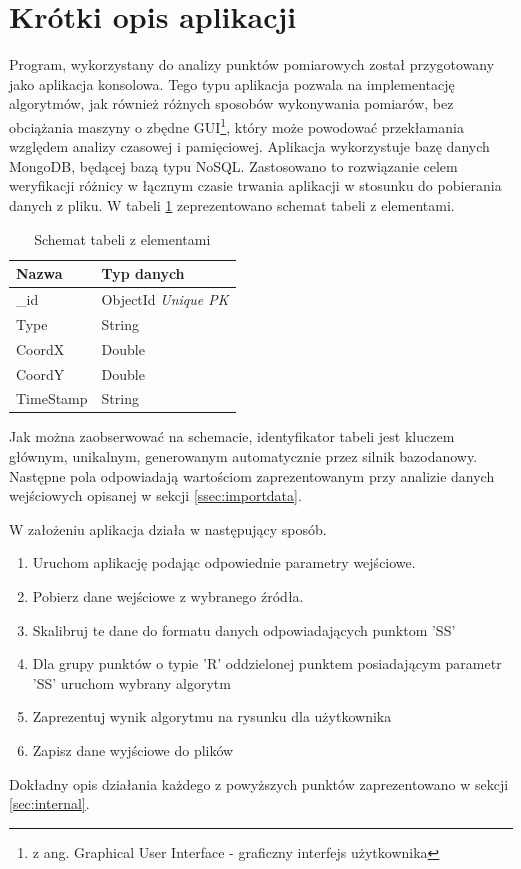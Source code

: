\section{Krótki opis aplikacji}
\label{sec:shortdesc}
Program, wykorzystany do analizy punktów pomiarowych został przygotowany jako aplikacja konsolowa. Tego typu aplikacja pozwala na implementację algorytmów, jak również różnych sposobów wykonywania pomiarów, bez obciążania maszyny o zbędne GUI\footnote{z ang. Graphical User Interface - graficzny interfejs użytkownika}, który może powodować przekłamania względem analizy czasowej i pamięciowej. Aplikacja wykorzystuje bazę danych MongoDB, będącej bazą typu NoSQL. Zastosowano to rozwiązanie celem weryfikacji różnicy w łącznym czasie trwania aplikacji w stosunku do pobierania danych z pliku. W tabeli \ref{tab:nosqlschema} zeprezentowano schemat tabeli z elementami.
\begin{table}[H]
    \centering
    \begin{tabular}{|l|l|}
    \hline
    \textbf{Nazwa} & \textbf{Typ danych} \\ \hline
    \_id           & ObjectId \textit{Unique PK} \\ \hline
    Type           & String              \\ \hline
    CoordX         & Double              \\ \hline
    CoordY         & Double              \\ \hline
    TimeStamp      & String              \\ \hline
    \end{tabular}
    \caption{Schemat tabeli z elementami}
    \label{tab:nosqlschema}
\end{table}
Jak można zaobserwować na schemacie, identyfikator tabeli jest kluczem głównym, unikalnym, generowanym automatycznie przez silnik bazodanowy. Następne pola odpowiadają wartościom zaprezentowanym przy analizie danych wejściowych opisanej w sekcji \ref{ssec:importdata}.\par
W założeniu aplikacja działa w następujący sposób.
\begin{enumerate}
        \item Uruchom aplikację podając odpowiednie parametry wejściowe.
        \item Pobierz dane wejściowe z wybranego źródła.
        \item Skalibruj te dane do formatu danych odpowiadających punktom 'SS'
        \item Dla grupy punktów o typie 'R' oddzielonej punktem posiadającym parametr 'SS' uruchom wybrany algorytm
        \item Zaprezentuj wynik algorytmu na rysunku dla użytkownika
        \item Zapisz dane wyjściowe do plików
\end{enumerate}
Dokładny opis działania każdego z powyższych punktów zaprezentowano w sekcji \ref{sec:internal}.
